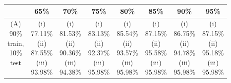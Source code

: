 \documentclass{style1}
\begin{document}
\begin{center}
\begin{tabular}{|c|c  |c  |c  |c  |c  |c  |c |} \hline 

  & 65\% & 70\% & 75\% & 80\% & 85\% & 90\% & 95\% \\ \hline  

\makecell{(A)\\90\%\\train,\\10\%\\test} &
\makecell{(i)\\77.11\%\\(ii)\\87.55\%\\(iii)\\93.98\%} &
\makecell{(i)\\81.53\%\\(ii)\\90.36\%\\(iii)\\94.38\%} &
\makecell{(i)\\83.13\%\\(ii)\\92.37\%\\(iii)\\95.98\%} & 
\makecell{(i)\\85.54\%\\(ii)\\93.57\%\\(iii)\\95.98\%} &
\makecell{(i)\\87.15\%\\(ii)\\95.58\%\\(iii)\\95.98\%} &
\makecell{(i)\\86.75\%\\(ii)\\94.78\%\\(iii)\\95.98\%} &
\makecell{(i)\\87.15\%\\(ii)\\95.18\%\\(iii)\\95.98\%}  \\ \hline 


\end{tabular}
\end{center}
\end{document}
